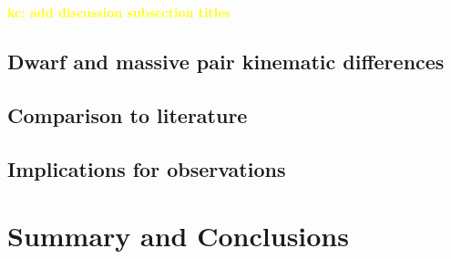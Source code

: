 \documentclass[twocolumn]{aastex631}
\newcommand{\kc}[1]{\textcolor{yellow}{\textbf{kc: #1}} }
\begin{document}
\kc{add discussion subsection titles}
\subsection{Dwarf and massive pair kinematic differences}
\subsection{Comparison to literature}
\subsection{Implications for observations}


\section{Summary and Conclusions}
\label{sec:summary}


{}

\end{document}
